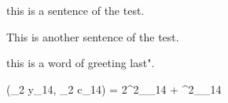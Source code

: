 this is a sentence of the test.

  This    is   	another sentence of the test.  

	this is a word of greeting last".

\cov(\Delta_{2} y_{14}, \Delta_{2} c_{14}) = 2\phi\sigma^2_{\zeta_{14}} + \psi\sigma^2_{\varepsilon_{14}}